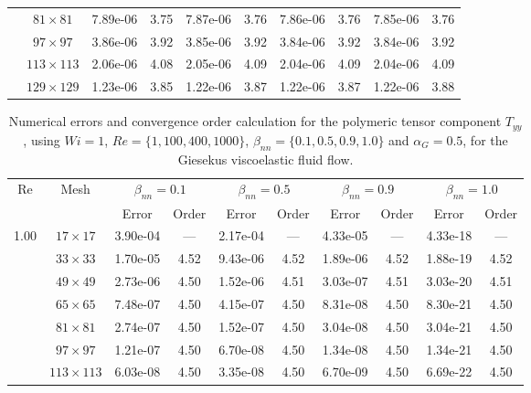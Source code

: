 \documentclass[preprint, 12pt]{elsarticle}
\begin{document}
\begin{center}
\begin{table}[H]
{\begin{tabular*}{\textwidth}{@{\extracolsep\fill}cccccccccc@{}}
    & $81\times 81$ & 7.89e-06 & 3.75 & 7.87e-06 & 3.76 & 7.86e-06 & 3.76 & 7.85e-06 & 3.76 \\
    & $97\times 97$ & 3.86e-06 & 3.92 & 3.85e-06 & 3.92 & 3.84e-06 & 3.92 & 3.84e-06 & 3.92 \\
    & $113\times 113$ & 2.06e-06 & 4.08 & 2.05e-06 & 4.09 & 2.04e-06 & 4.09 & 2.04e-06 & 4.09 \\
    & $129\times 129$ & 1.23e-06 & 3.85 & 1.22e-06 & 3.87 & 1.22e-06 & 3.87 & 1.22e-06 & 3.88 \\
    \hline
    \end{tabular*}
}
\end{table}
\end{center}

\begin{center}
\begin{table}[H]
\caption{Numerical errors and convergence order calculation for the polymeric tensor component $T_{yy}$, using \mbox{$Wi=1$}, $Re=\{1,100,400,1000\}$, $\beta_{nn}=\{0.1,0.5,0.9,1.0\}$ and \mbox{$\alpha_G = 0.5$}, for the Giesekus viscoelastic fluid flow.\label{tab_GiesekusTyyalphaG05Resumida}}
\scriptsize{
    \begin{tabular*}{\textwidth}{@{\extracolsep\fill}cccccccccc@{}}
    \hline
    \multirow{2}{*}{$\operatorname{Re}$} & \multirow{2}{*}{Mesh} & \multicolumn{2}{c}{$\beta_{nn}=0.1$}  & \multicolumn{2}{c}{$\beta_{nn}=0.5$}  & \multicolumn{2}{c}{$\beta_{nn}=0.9$}  & \multicolumn{2}{c}{$\beta_{nn}=1.0$}\\ %
     & & Error & Order & Error & Order & Error & Order & Error & Order \\
    \hline
    \multirow{7}{*}{1.00} & $17\times 17$ & 3.90e-04 & --- & 2.17e-04 & --- & 4.33e-05 & --- & 4.33e-18 & --- \\
    & $33\times 33$ & 1.70e-05 & 4.52 & 9.43e-06 & 4.52 & 1.89e-06 & 4.52 & 1.88e-19 & 4.52 \\
    & $49\times 49$ & 2.73e-06 & 4.50 & 1.52e-06 & 4.51 & 3.03e-07 & 4.51 & 3.03e-20 & 4.51 \\
    & $65\times 65$ & 7.48e-07 & 4.50 & 4.15e-07 & 4.50 & 8.31e-08 & 4.50 & 8.30e-21 & 4.50 \\
    & $81\times 81$ & 2.74e-07 & 4.50 & 1.52e-07 & 4.50 & 3.04e-08 & 4.50 & 3.04e-21 & 4.50 \\
    & $97\times 97$ & 1.21e-07 & 4.50 & 6.70e-08 & 4.50 & 1.34e-08 & 4.50 & 1.34e-21 & 4.50 \\
    & $113\times 113$ & 6.03e-08 & 4.50 & 3.35e-08 & 4.50 & 6.70e-09 & 4.50 & 6.69e-22 & 4.50 \\

\end{tabular*}}
\end{table}
\end{center}
\end{document}
